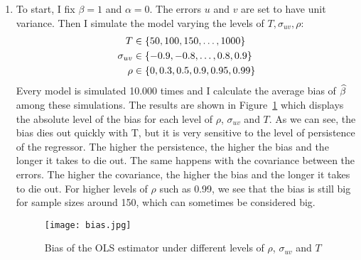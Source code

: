 \begin{solution}
\begin{enumerate}[label = (\alph*)]
    \item To start, I fix \(\beta = 1\) and \(\alpha = 0\). The errors \(u\) and \(v\) are set to have unit variance. Then I simulate the model varying the levels of \(T, \sigma_{uv}, \rho\):
    \begin{align*}
        T & \in \left\lbrace 50, 100, 150, \dots, 1000 \right\rbrace \\
        \sigma_{uv} & \in \left\lbrace -0.9, -0.8, \dots, 0.8, 0.9 \right\rbrace \\
        \rho & \in \left\lbrace 0, 0.3, 0.5, 0.9, 0.95, 0.99 \right\rbrace
    \end{align*}
    Every model is simulated 10.000 times and I calculate the average bias of \(\widehat{\beta}\) among these simulations. The results are shown in Figure~\ref{fig:bias} which displays the absolute level of the bias for each level of \(\rho\), \(\sigma_{uv}\) and \(T\). As we can see, the bias dies out quickly with T, but it is very sensitive to the level of persistence of the regressor. The higher the persistence, the higher the bias and the longer it takes to die out. The same happens with the covariance between the errors. The higher the covariance, the higher the bias and the longer it takes to die out. For higher levels of \(\rho\) such as 0.99, we see that the bias is still big for sample sizes around 150, which can sometimes be considered big.
    \begin{figure}[!htbp]
        \centering
        \texttt{[image: bias.jpg]}
        \caption{Bias of the OLS estimator under different levels of \(\rho\), \(\sigma_{uv}\) and \(T\)}
        \label{fig:bias}
    \end{figure}
\end{enumerate}
\end{solution}